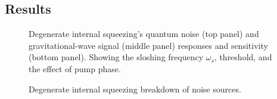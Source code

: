 \subsection{Results}


\begin{figure}
	\centering
	\caption{Degenerate internal squeezing's quantum noise (top panel) and gravitational-wave signal (middle panel) responses and sensitivity (bottom panel). Showing the sloshing frequency $\omega_s$, threshold, and the effect of pump phase. }
	\label{fig:dIS_sensitivity}
\end{figure}

\begin{figure}
	\centering
	\caption{Degenerate internal squeezing breakdown of noise sources.}
	\label{fig:dIS_noise_budget}
\end{figure}


